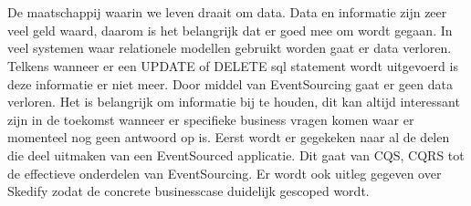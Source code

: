 


\chapter*{}

De maatschappij waarin we leven draait om data. Data en informatie zijn zeer veel geld waard, daarom is het belangrijk dat er goed mee om wordt gegaan. In veel systemen waar relationele modellen gebruikt worden gaat er data verloren. Telkens wanneer er een UPDATE of DELETE sql statement wordt uitgevoerd is deze informatie er niet meer. Door middel van EventSourcing gaat er geen data verloren.
Het is belangrijk om informatie bij te houden, dit kan altijd interessant zijn in de toekomst wanneer er specifieke business vragen komen waar er momenteel nog geen antwoord op is.
Eerst wordt er gegekeken naar al de delen die deel uitmaken van een EventSourced applicatie. Dit gaat van CQS, CQRS tot de effectieve onderdelen van EventSourcing. Er wordt ook uitleg gegeven over Skedify zodat de concrete businesscase duidelijk gescoped wordt.
